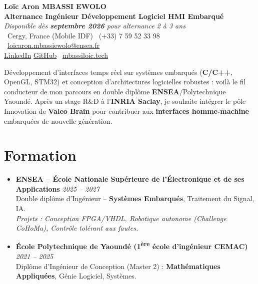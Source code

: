 \documentclass[a4paper,11pt]{article}
\begin{document}
\begin{center}
    {\Large \textbf{Loïc Aron MBASSI EWOLO}} \\ \vspace{4pt}
    \textbf{\large Alternance Ingénieur Développement Logiciel HMI Embarqué} \\
    \textit{\small Disponible dès \textbf{septembre 2026} pour alternance 2 à 3 ans} \\ \vspace{4pt}
    \small
    \Letter\ Cergy, France (Mobile IDF) \quad
    \Telefon\ (+33) 7 59 52 33 98 \quad
    \MVAt\ \href{mailto:loicaron.mbassiewolo@ensea.fr}{loicaron.mbassiewolo@ensea.fr} \\ \vspace{2pt}
    \href{https://www.linkedin.com/in/loic-mbassi/}{LinkedIn} \quad
    \href{https://github.com/Nameless0l}{GitHub} \quad
    \Mundus\ \href{https://mbassiloic.tech}{mbassiloic.tech}
\end{center}

\vspace{-6pt}

\noindent\small{Développement d'interfaces temps réel sur systèmes embarqués (\textbf{C/C++}, OpenGL, STM32) et conception d'architectures logicielles robustes : voilà le fil conducteur de mon parcours en double diplôme \textbf{ENSEA}/Polytechnique Yaoundé. Après un stage R\&D à l'\textbf{INRIA Saclay}, je souhaite intégrer le pôle Innovation de \textbf{Valeo Brain} pour contribuer aux \textbf{interfaces homme-machine} embarquées de nouvelle génération.}

\section{Formation}
\begin{itemize}[leftmargin=*, label=\tiny$\bullet$, nosep]
    \item \textbf{ENSEA -- École Nationale Supérieure de l'Électronique et de ses Applications} \hfill \textit{2025 -- 2027} \\
    \small{Double diplôme d'Ingénieur -- \textbf{Systèmes Embarqués}, Traitement du Signal, IA.} \\
    \textit{\small{Projets : Conception FPGA/VHDL, Robotique autonome (Challenge CoHoMa), Contrôle tolérant aux fautes.}}
    \vspace{2pt}
    \item \textbf{École Polytechnique de Yaoundé (1\textsuperscript{ère} école d'ingénieur CEMAC)} \hfill \textit{2021 -- 2025} \\
    \small{Diplôme d'Ingénieur de Conception (Master 2) : \textbf{Mathématiques Appliquées}, Génie Logiciel, Systèmes.}
\end{itemize}
\end{document}
